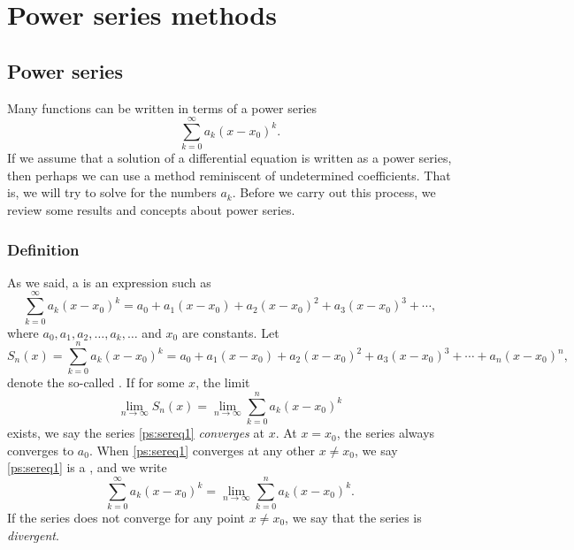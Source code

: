 \chapter{Power series methods} \label{ps:chapter}


\section{Power series}
\label{powerseries:section}


Many functions can be written in terms of a power series
\begin{equation*}
\sum_{k=0}^\infty a_k {(x-x_0)}^k .
\end{equation*}
If we assume that a solution of a differential equation is written as a
power series, then perhaps we can use a method reminiscent of undetermined
coefficients.  That is, we will try to solve for the numbers $a_k$.
Before we carry out this process, we review some results
and concepts about power series.

\subsection{Definition}

As we said, a \emph{} is an expression such as
\begin{equation} \label{ps:sereq1}
\sum_{k=0}^\infty a_k {(x-x_0)}^k =
a_0 + 
a_1 (x-x_0) +
a_2 {(x-x_0)}^2 +
a_3 {(x-x_0)}^3 + \cdots,
\end{equation}
where $a_0,a_1,a_2,\ldots,a_k,\ldots$ and $x_0$ are constants.  Let
\begin{equation*}
S_n(x) = \sum_{k=0}^n a_k {(x-x_0)}^k =
a_0 + a_1 (x-x_0) + a_2 {(x-x_0)}^2 + a_3 {(x-x_0)}^3 + \cdots + a_n {(x-x_0)}^n ,
\end{equation*}
denote the so-called \emph{}.  If for some $x$,
the limit
\begin{equation*}
\lim_{n\to \infty} S_n(x) = \lim_{n\to\infty} \sum_{k=0}^n a_k {(x-x_0)}^k
\end{equation*}
exists, we say the series \eqref{ps:sereq1}
\emph{converges} at $x$.
At $x=x_0$, the series always converges to $a_0$.
When \eqref{ps:sereq1}
converges at any other $x \not= x_0$,
we say \eqref{ps:sereq1} is a
\emph{}, and we write
\begin{equation*}
\sum_{k=0}^\infty a_k {(x-x_0)}^k = 
\lim_{n\to\infty} \sum_{k=0}^n a_k {(x-x_0)}^k.
\end{equation*}
If the series does not converge for any point $x \not= x_0$, we say that
the series is \emph{divergent}.

